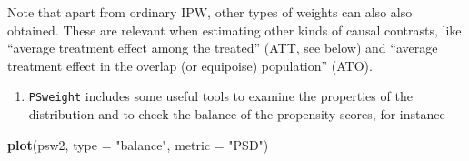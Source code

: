 \documentclass[
]{book}
\newenvironment{Shaded}{\begin{snugshade}}{\end{snugshade}}
\newcommand{\AttributeTok}[1]{\textcolor[rgb]{0.13,0.29,0.53}{#1}}
\newcommand{\DecValTok}[1]{\textcolor[rgb]{0.00,0.00,0.81}{#1}}
\newcommand{\FunctionTok}[1]{\textcolor[rgb]{0.13,0.29,0.53}{\textbf{#1}}}
\newcommand{\NormalTok}[1]{#1}
\newcommand{\OtherTok}[1]{\textcolor[rgb]{0.56,0.35,0.01}{#1}}
\newcommand{\SpecialCharTok}[1]{\textcolor[rgb]{0.81,0.36,0.00}{\textbf{#1}}}
\newcommand{\StringTok}[1]{\textcolor[rgb]{0.31,0.60,0.02}{#1}}
\providecommand{\tightlist}{%
  \setlength{\itemsep}{0pt}\setlength{\parskip}{0pt}}
\begin{document}
\begin{Shaded}
\end{Shaded}

Note that apart from ordinary IPW, other types of
weights can also also
obtained. These are relevant when estimating other
kinds of causal
contrasts, like ``average treatment effect among the treated''
(ATT, see below) and ``average treatment effect in the overlap
(or equipoise) population'' (ATO).

\begin{enumerate}
\def\labelenumi{\arabic{enumi}.}
\setcounter{enumi}{1}
\tightlist
\item
  \texttt{PSweight} includes some useful tools to examine the
  properties of the distribution and to check the balance
  of the propensity scores, for instance
\end{enumerate}

\begin{Shaded}
\begin{Highlighting}[]
\FunctionTok{plot}\NormalTok{(psw2, }\AttributeTok{type =} \StringTok{"balance"}\NormalTok{, }\AttributeTok{metric =} \StringTok{"PSD"}\NormalTok{)}
\end{Highlighting}
\end{Shaded}
\end{document}
